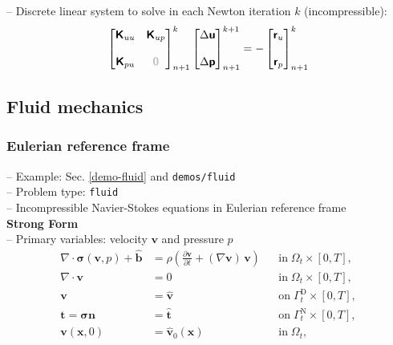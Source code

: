 \documentclass[a4paper,12pt]{report}
\newcommand{\bs}[1]{\boldsymbol{#1}}
\newcommand{\Om}{\mathit{\Omega}}
\newcommand{\Gm}{\mathit{\Gamma}}
\newcommand{\zerom}{\textcolor{lightgray}{\bs{\mathsf{0}}}}
\newcommand{\ROP}{\bs{\mathsf{r}}}
\begin{document}
-- Discrete linear system to solve in each Newton iteration $k$ (incompressible):
\begin{equation}
\label{equation-lin-sys-solid-inc}
\begin{aligned}
\begin{bmatrix} \bs{\mathsf{K}}_{uu} & \bs{\mathsf{K}}_{up} \\ \\ \bs{\mathsf{K}}_{pu} & \zerom \end{bmatrix}_{n+1}^{k}\begin{bmatrix} \Delta\bs{\mathsf{u}} \\ \\ \Delta\bs{\mathsf{p}} \end{bmatrix}_{n+1}^{k+1}=-\begin{bmatrix} \ROP_{u} \\ \\ \ROP_{p} \end{bmatrix}_{n+1}^{k}
\end{aligned}
\end{equation}




\subsection{Fluid mechanics}\label{fluid-mechanics}

\subsubsection{Eulerian reference frame}\label{eulerian-reference-frame}

-- Example: Sec. \ref{demo-fluid} and \verb"demos/fluid"\\

-- Problem type: \verb.fluid.\\

-- Incompressible Navier-Stokes equations in Eulerian reference frame\\

\textbf{Strong Form}\\

-- Primary variables: velocity $\bs{v}$ and pressure $p$
\begin{equation}
\label{equation-fluid-strong-form}
\begin{aligned}
\nabla \cdot \bs{\sigma}(\bs{v},p) + \hat{\bs{b}} &= \rho\left(\frac{\partial\bs{v}}{\partial t} + (\nabla\bs{v})\,\bs{v}\right) &&\text{in} \; \mathit{\Om}_t \times [0, T], \\
\nabla\cdot \bs{v} &= 0 &&\text{in} \; \mathit{\Om}_t \times [0, T],\\
\bs{v} &= \hat{\bs{v}} &&\text{on} \; \mathit{\Gm}_t^{\mathrm{D}} \times [0, T],\\
\bs{t} = \bs{\sigma}\bs{n} &= \hat{\bs{t}} &&\text{on} \; \mathit{\Gm}_t^{\mathrm{N}} \times [0, T],\\
\bs{v}(\bs{x},0) &= \hat{\bs{v}}_{0}(\bs{x}) &&\text{in} \; \mathit{\Om}_t,
\end{aligned}
\end{equation}
\end{document}
